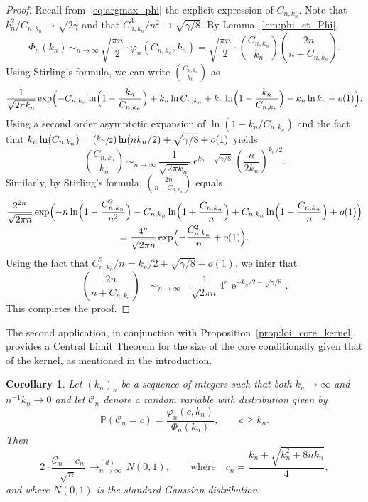 \documentclass[JEP,XML,SOM,Unicode,NoFloatCountersInSection,NoEqCountersInSection]{cedram}
\newcommand{\Psfrac}[2]{(\sfrac{#1}{#2})}
\theoremstyle{plain}
\newtheorem{corollary}[theorem]{Corollary}
\theoremstyle{definition}
\theoremstyle{remark}
\renewcommand{\P}{\mathbb{P}}
\newcommand{\e}{\operatorname{e}}
\newcommand{\cvloi}[1][n]{\,\mathop{\longrightarrow}^{(d)}_{#1 \to \infty}\,}
\begin{document}
\begin{proof}
Recall from~\eqref{eq:argmax_phi} the explicit expression of $C_{n,k_{n}}$. Note that $k_{n}^{2}/C_{n,k_{n}} \rightarrow \sqrt{2 \gamma}$ and that $C_{n,k_n}^{3}/n^{2} \rightarrow \sqrt{\gamma/8}$. By Lemma~\ref{lem:phi_et_Phi},\vspace*{-3pt}
\[
\Phi_{n}(k_{n}) \, \mathop{\sim}_{n \rightarrow \infty} \, \sqrt{ \frac{\pi n}{2}} \cdot \varphi_{n}(C_{n,k_n},k_n)= \sqrt{ \frac{\pi n}{2}} \cdot \binom{C_{n,k_{n}}}{k_{n}} \binom{2n}{n+C_{n,k_{n}}}.
\]
Using Stirling's formula, we can write $ \binom{C_{n,k_{n}}}{k_{n}}$ as\vspace*{-3pt}
\[
\frac{1}{\sqrt{2 \pi k_{n}}} \exp \Bigl(-C_{n,k_n} \ln \Bigl(1- \frac{k_{n}}{C_{n,k_n}}\Bigr)+ k_{n} \ln C_{n,k_n}+ k_{n} \ln \Bigl(1- \frac{k_{n}}{C_{n,k_n}}\Bigr)-k_{n} \ln k_{n} +o(1) \Bigr).
\]
Using a second order asymptotic expansion of $\ln(1-k_{n}/C_{n,k_n})$ and the fact that $k_{n }\ln(C_{n,k_{n}})= \Psfrac{k_{n}}{2} \ln(n k_{n}/2)+\sqrt{\gamma/8}+o(1)$ yields\vspace*{-3pt}
\[
\binom{C_{n,k_{n}}}{k_{n}} \, \mathop{\sim}_{n \rightarrow \infty} \, \frac{1}{\sqrt{2 \pi k_{n}}} \e^{k_{n}-\sqrt{\gamma/8}} \left(\frac{n}{2 k_{n}}\right)^{k_{n}/2}.
\]
Similarly, by Stirling's formula,
$\binom{2n}{n+C_{n,k_{n}}}$ equals\vspace*{-5pt}
\begin{multline*}
\frac{2^{2n}}{\sqrt{ 2 \pi n}} \exp \Bigl(-n \ln \Bigl(1- \frac{C_{n,k_n}^{2}}{n^{2}} \Bigr)-C_{n,k_n}\ln \Bigl(1+ \frac{C_{n,k_n}}{n} \Bigr) + C_{n,k_n}\ln \Bigl(1- \frac{C_{n,k_n}}{n}\Bigr)+o(1)\Bigr)
\\[-3pt]
= \frac{4^n}{\sqrt{ 2 \pi n}} \exp \Bigl(- \frac{C_{n,k_n}^{2}}{n}+o(1) \Bigr).
\end{multline*}
Using the fact that $C_{n,k_n}^{2}/n=k_{n}/2+ \sqrt{\gamma/8}+o(1)$, we infer that
\[
\binom{2n}{n+C_{n,k_{n}}} \quad \mathop{\sim}_{n \rightarrow \infty} \quad \frac{1}{\sqrt{ 2 \pi n}} 4^{n} \e^{-k_{n}/2-\sqrt{\gamma/8}}.
\]
This completes the proof.
\end{proof}

The second application, in conjunction with Proposition~\ref{prop:loi_core_kernel}, provides a Central Limit Theorem for the size of the core conditionally given that of the kernel, as mentioned in the introduction.

\begin{corollary}\label{cor:TCL_core}
Let $(k_n)_n$ be a sequence of integers such that both $k_n \to \infty$ and $n^{-1} k_n\to0$ and let $\mathcal{C}_{n}$ denote a random variable with distribution given by\vspace*{-3pt}
\[
\P(\mathcal{C}_{n}=c)= \frac{\varphi_{n}(c,k_{n})}{ \Phi_{n}(k_{n})}, \qquad c \geq k_{n}.
\]
Then\vspace*{-3pt}
\[
2 \cdot \frac{ \mathcal{C}_{n}-c_n}{ \sqrt{n}} \cvloi N(0,1),
\qquad\text{where}\quad
c_n = \frac{k_n + \sqrt{k_n^{2} + 8 n k_n }}{4} ,
\]
and where $N(0,1)$ is the standard Gaussian distribution.
\end{corollary}
\end{document}
